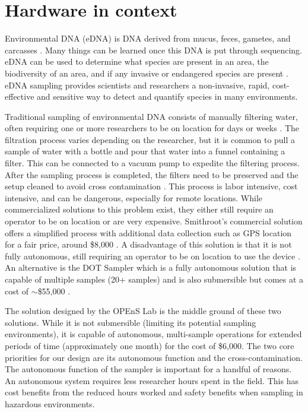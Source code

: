 \documentclass[11pt, letterpaper]{article}
\begin{document}

\newpage
\section{Hardware in context}

Environmental DNA (eDNA) is DNA derived from mucus, feces, gametes, and carcasses \cite{web:USGS:eDNA}. Many things can be learned once this DNA is put through sequencing. eDNA can be used to determine what species are present in an area, the biodiversity of an area, and if any invasive or endangered species are present \cite{web:NOAA:eDNA}. eDNA sampling provides scientists and researchers a non-invasive, rapid, cost-effective and sensitive way to detect and quantify species in many environments.  
\newline\par
Traditional sampling of environmental DNA consists of manually filtering water, often requiring one or more researchers to be on location for days or weeks \cite{art:Taal}. The filtration process varies depending on the researcher, but it is common to pull a sample of water with a bottle and pour that water into a funnel containing a filter. This can be connected to a vacuum pump to expedite the filtering process. After the sampling process is completed, the filters need to be preserved and the setup cleaned to avoid cross contamination \cite{art:Taal}. This process is labor intensive, cost intensive, and can be dangerous, especially for remote locations. While commercialized solutions to this problem exist, they either still require an operator to be on location or are very expensive. Smithroot’s commercial solution offers a simplified process with additional data collection such as GPS location for a fair price, around \$8,000 \cite{web:smithroot}. A disadvantage of this solution is that it is not fully autonomous, still requiring an operator to be on location to use the device \cite{web:smithroot}. An alternative is the DOT Sampler which is a fully autonomous solution that is capable of multiple samples (20+ samples) and is also submersible but comes at a cost of $\sim$\$55,000 \cite{art:DOT}. 
\newline\par
The solution designed by the OPEnS Lab is the middle ground of these two solutions. While it is not submersible (limiting its potential sampling environments), it is capable of autonomous, multi-sample operations for extended periods of time (approximately one month) for the cost of \$6,000. The two core priorities for our design are its autonomous function and the cross-contamination. The autonomous function of the  sampler is important for a handful of reasons. An autonomous system requires less researcher hours spent in the field. This has cost benefits from the reduced hours worked and safety benefits when sampling in hazardous environments.     
\end{document}
